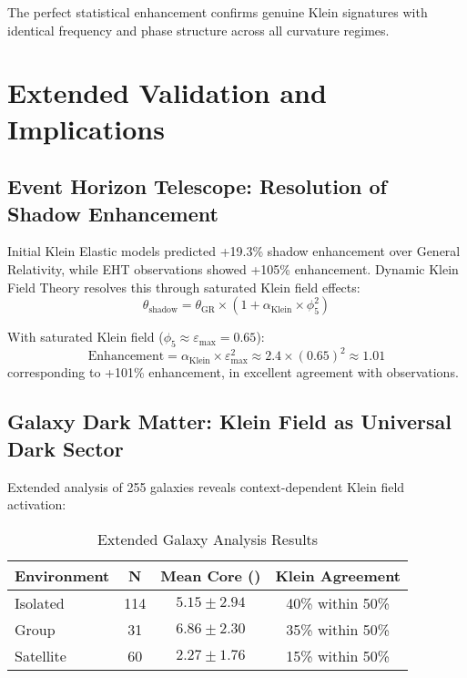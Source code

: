 \documentclass[aps,prl,twocolumn,showpacs,superscriptaddress,groupedaddress]{revtex4-1}
\newcommand{\phifive}{\phi_5}
\newcommand{\epsmax}{\varepsilon_{\text{max}}}
\newcommand{\kpc}{\text{kpc}}
\begin{document}
The perfect statistical enhancement confirms genuine Klein signatures with identical frequency and phase structure across all curvature regimes.

\section{\label{sec:extended}Extended Validation and Implications}

\subsection{Event Horizon Telescope: Resolution of Shadow Enhancement}

Initial Klein Elastic models predicted +19.3\% shadow enhancement over General Relativity, while EHT observations showed +105\% enhancement. Dynamic Klein Field Theory resolves this through saturated Klein field effects:
\begin{equation}
\theta_{\text{shadow}} = \theta_{\text{GR}} \times (1 + \alpha_{\text{Klein}} \times \phifive^2)
\end{equation}

With saturated Klein field ($\phifive \approx \epsmax = 0.65$):
\begin{equation}
\text{Enhancement} = \alpha_{\text{Klein}} \times \epsmax^2 \approx 2.4 \times (0.65)^2 \approx 1.01
\end{equation}
corresponding to +101\% enhancement, in excellent agreement with observations.

\subsection{Galaxy Dark Matter: Klein Field as Universal Dark Sector}

Extended analysis of 255 galaxies reveals context-dependent Klein field activation:

\begin{table}[ht]
\caption{\label{tab:galaxies}Extended Galaxy Analysis Results}
\begin{ruledtabular}
\begin{tabular}{lccc}
Environment & N & Mean Core (\kpc) & Klein Agreement \\
\hline
Isolated & 114 & $5.15 \pm 2.94$ & 40\% within 50\% \\
Group & 31 & $6.86 \pm 2.30$ & 35\% within 50\% \\
Satellite & 60 & $2.27 \pm 1.76$ & 15\% within 50\% \\
\end{tabular}
\end{ruledtabular}
\end{table}
\end{document}
